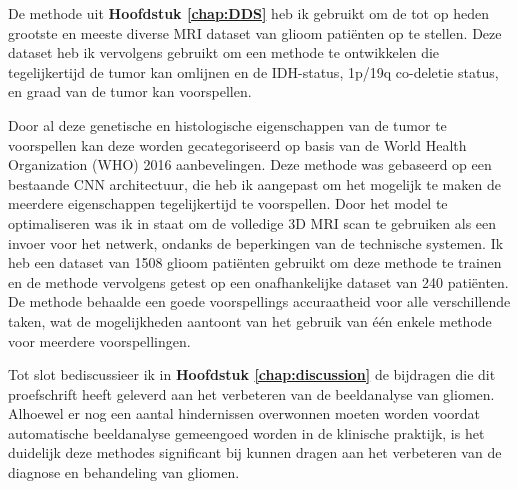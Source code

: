 De methode uit \textbf{Hoofdstuk \ref{chap:DDS}} heb ik gebruikt om de tot op heden grootste en meeste diverse MRI dataset van glioom patiënten op te stellen.
Deze dataset heb ik vervolgens gebruikt om een methode te ontwikkelen die tegelijkertijd de tumor kan omlijnen en de IDH-status, 1p/19q co-deletie status, en graad van de tumor kan voorspellen.

Door al deze genetische en histologische eigenschappen van de tumor te voorspellen kan deze worden gecategoriseerd op basis van de World Health Organization (WHO) 2016 aanbevelingen.
Deze methode was gebaseerd op een bestaande CNN architectuur, die heb ik aangepast om het mogelijk te maken de meerdere eigenschappen tegelijkertijd te voorspellen.
Door het model te optimaliseren was ik in staat om de volledige 3D MRI scan te gebruiken als een invoer voor het netwerk, ondanks de beperkingen van de technische systemen.
Ik heb een dataset van 1508 glioom patiënten gebruikt om deze methode te trainen en de methode vervolgens getest op een onafhankelijke dataset van 240 patiënten.
De methode behaalde een goede voorspellings accuraatheid voor alle verschillende taken, wat de mogelijkheden aantoont van het gebruik van één enkele methode voor meerdere voorspellingen.

Tot slot bediscussieer ik in \textbf{Hoofdstuk \ref{chap:discussion}} de bijdragen die dit proefschrift heeft geleverd aan het verbeteren van de beeldanalyse van gliomen.
Alhoewel er nog een aantal hindernissen overwonnen moeten worden voordat automatische beeldanalyse gemeengoed worden in de klinische praktijk, is het duidelijk deze methodes significant bij kunnen dragen aan het verbeteren van de diagnose en behandeling van gliomen.


